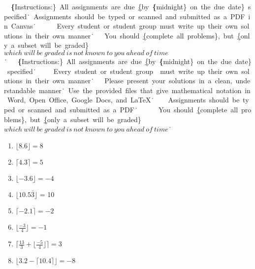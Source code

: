 
\extrawidth{0.5in} \extrafootheight{-0in} \pagestyle{headandfoot}
\headrule {} \footrule {}


\ifprintanswers\
\noindent\ \textbf\{Instructions:\}\ All\ assignments\ are\ due\ \underline\{by\
\textbf\{midnight\}\ on\ the\ due\ date\}\ specified\.\ \ Assignments\ should\ be\ typed\ or\
scanned\ and\ submitted\ as\ a\ PDF\ in\ Canvas\.\ \ \ \
\
\medskip\
\noindent\ Every\ student\ or\ student\ group\ must\ write\ up\ their\ own\ solutions\ in\
their\ own\ manner\.\
\
\medskip\
\noindent\ You\ should\ \underline\{complete\ all\ problems\},\ but\ \underline\{only\ a\
subset\ will\ be\ graded\}\ \(which\ will\ be\ graded\ is\ not\ known\ to\ you\ ahead\ of\
time\)\.\ \
\else\
\noindent\ \textbf\{Instructions:\}\ All\ assignments\ are\ due\ \underline\{by\ \textbf\{midnight\}\ on\ the\ due\ date\}\ specified\.\ \ \
\
\medskip\
\noindent\ Every\ student\ or\ student\ group\ \ must\ write\ up\ their\ own\ solutions\ in\
their\ own\ manner\.\
\
\medskip\
\noindent\ Please\ present\ your\ solutions\ in\ a\ clean,\ understandable\
manner\.\ \ Use\ the\ provided\ files\ that\ give\ mathematical\ notation\ in\ Word,\ Open\ Office,\ Google\ Docs,\ and\ \LaTeX\.\ \
\
\medskip\
\noindent\ Assignments\ should\ be\ typed\ or\ scanned\ and\ submitted\ as\ a\ PDF\.\ \ \ \
\
\medskip\
\noindent\ You\ should\ \underline\{complete\ all\ problems\},\ but\ \underline\{only\ a\
subset\ will\ be\ graded\}\ \(which\ will\ be\ graded\ is\ not\ known\ to\ you\ ahead\ of\
time\)\.\ \
\fi
\begin{solution}
	\vspace{-5pt}
	\begin{enumerate}[label=(\alph*),itemsep=3pt,parsep=0pt,topsep=0pt,partopsep=0pt]
		\item $\lfloor 8.6 \rfloor = 8$
		\item $\lceil 4.3 \rceil = 5$
		\item $\lfloor -3.6 \rfloor = -4$
		\item $\lfloor 10.5\bar{3} \rfloor $ = 10
		\item $\lceil -2.1 \rceil = -2$
		\item $\lfloor \frac{-3}{4} \rfloor = -1$ 
		\item $\lceil \frac{13}{3} + \lfloor \frac{-5}{4} \rfloor \rceil = 3$
		\item $\lfloor 3.2 - \lceil 10.4 \rceil \rfloor = -8$
	\end{enumerate}
\end{solution}

